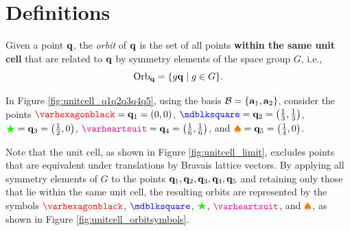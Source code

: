 \section{Definitions}


\begin{definition}[Orbit of $\q$] \label{def:orbit_q}
Given a point \(\q\), the \textit{orbit} of \(\q\) is the set of all points \textbf{within the same unit cell} that are related to \(\q\) by symmetry elements of the space group \(G\), i.e.,
\begin{equation} \label{eq:orbit_of_q}
\text{Orb}_{\vb{q}} = \{g {\vb{q}} \mid g \in G\}.
\end{equation}
\end{definition}

\begin{example} \label{ex:orbit_1a2b3c}
In Figure \ref{fig:unitcell_q1q2q3q4q5}, using the basis $\mathcal{B} = \{{\vb{a}}_1, {\vb{a}}_2\}$, consider the points \(\textcolor{red}{\varhexagonblack} = \q_1 = (0,0)\), \(\textcolor{blue}{\mdblksquare} = \q_2 = \qty(\frac{1}{3}, \frac{1}{3})\), \(\textcolor{green}{\bigstar} = {\vb{q}}_3 = \qty(\frac{1}{2}, 0)\), \(\textcolor{magenta}{\varheartsuit} = \q_4 = \qty(\frac{1}{6}, \frac{1}{6})\), and \(\textcolor{orange}{\spadesuit} = {\vb{q}}_5 = \qty(\frac{1}{4}, 0)\).

Note that the unit cell, as shown in Figure \ref{fig:unitcell_limit}, excludes points that are equivalent under translations by Bravais lattice vectors. By applying all symmetry elements of \(G\) to the points \({\vb{q}}_1, {\vb{q}}_2, {\vb{q}}_3, {\vb{q}}_4, {\vb{q}}_5\) and retaining only those that lie within the same unit cell, the resulting orbits are represented by the symbols \(\textcolor{red}{\varhexagonblack}\), \(\textcolor{blue}{\mdblksquare}\), \(\textcolor{green}{\bigstar}\), \(\textcolor{magenta}{\varheartsuit}\), and \(\textcolor{orange}{\spadesuit}\), as shown in Figure \ref{fig:unitcell_orbitsymbols}.
\end{example}

